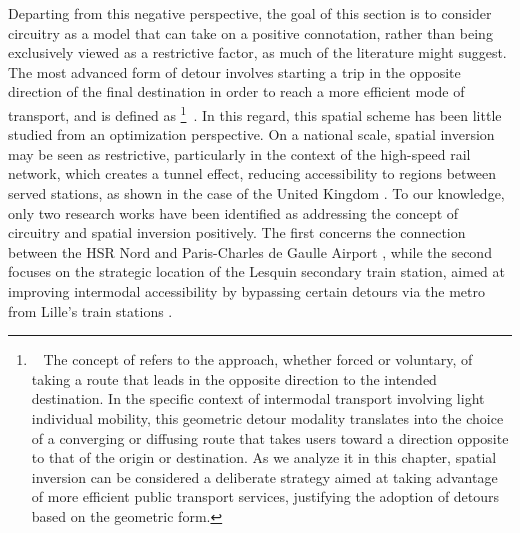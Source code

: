 \begin{refsegment}
Departing from this negative perspective, the goal of this section is to consider circuitry as a model that can take on a positive connotation, rather than being exclusively viewed as a restrictive factor, as much of the literature might suggest. The most advanced form of detour involves starting a trip in the opposite direction of the final destination in order to reach a more efficient mode of transport, and is defined as \footnote{~
The concept of  refers to the approach, whether forced or voluntary, of taking a route that leads in the opposite direction to the intended destination. In the specific context of intermodal transport involving light individual mobility, this geometric detour modality translates into the choice of a converging or diffusing route that takes users toward a direction opposite to that of the origin or destination. As we analyze it in this chapter, spatial inversion can be considered a deliberate strategy aimed at taking advantage of more efficient public transport services, justifying the adoption of detours based on the geometric form.
}~\textcolor{blue}{\autocite[106]{tobler_map_1961, bunge_theoretical_1966}}. In this regard, this spatial scheme has been little studied from an optimization perspective. On a national scale, spatial inversion may be seen as restrictive, particularly in the context of the high-speed rail network, which creates a tunnel effect, reducing accessibility to regions between served stations, as shown in the case of the United Kingdom \textcolor{blue}{\autocite[112]{martinez_sanchez-mateos_accessibility_2012}}. To our knowledge, only two research works have been identified as addressing the concept of circuitry and spatial inversion positively. The first concerns the connection between the \acrfull{HSR} Nord and Paris-Charles de Gaulle Airport \textcolor{blue}{\autocite[144, 161]{lhostis_detour_2014}}, while the second focuses on the strategic location of the Lesquin secondary train station, aimed at improving intermodal accessibility by bypassing certain detours via the metro from Lille's train stations \textcolor{blue}{\autocite[14-17]{lhostis_definir_2010}}.%


\end{refsegment}
